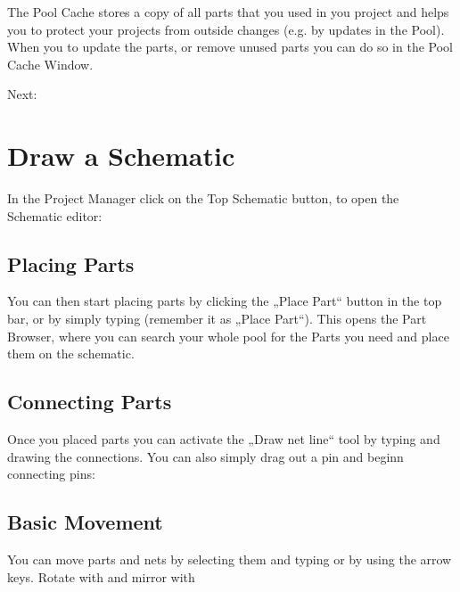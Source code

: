 \documentclass[letterpaper,10pt,czech]{sphinxmanual}
\begin{document}
The Pool Cache stores a copy of all parts that you used in you project and helps you to protect your projects from outside changes (e.g. by updates in the Pool). When you  to update the parts, or remove unused parts you can do so in the Pool Cache Window.

Next: {\hyperref[\detokenize{draw-schematic::doc}]{}}


\chapter{Draw a Schematic}
\label{\detokenize{draw-schematic:draw-a-schematic}}\label{\detokenize{draw-schematic::doc}}
In the Project Manager click on the Top Schematic button, to open the Schematic editor:

\noindent{}


\section{Placing Parts}
\label{\detokenize{draw-schematic:placing-parts}}
You can then start placing parts by clicking the „Place Part“ button in the top bar, or by simply typing  (remember it as „Place Part“). This opens the Part Browser, where you can search your whole pool for the Parts you need and place them on the schematic.

\noindent{}


\section{Connecting Parts}
\label{\detokenize{draw-schematic:connecting-parts}}
Once you placed parts you can activate the „Draw net line“ tool by typing  and drawing the connections. You can also simply drag out a pin and beginn connecting pins:

\noindent{}


\section{Basic Movement}
\label{\detokenize{draw-schematic:basic-movement}}
You can move parts and nets by selecting them and typing  or by using the  arrow keys. Rotate with  and mirror with 
\end{document}
